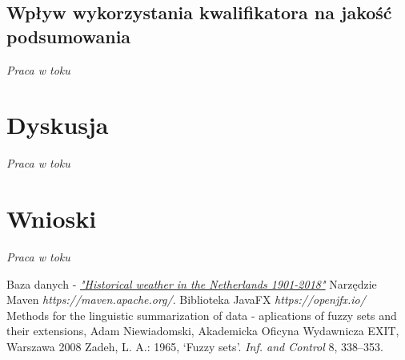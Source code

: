 \documentclass{classrep}
\begin{document}
\clearpage



\subsection{Wpływ wykorzystania kwalifikatora na jakość podsumowania}
\textit{Praca w toku}




\section{Dyskusja}
\textit{Praca w toku}


\section{Wnioski}
\textit{Praca w toku}


\begin{thebibliography}{5}
Baza danych - 
\href{https://www.kaggle.com/sinaasappel/historical-weather-in-the-netherlands-19012018}{\textit{"Historical weather in the Netherlands 1901-2018"}}
Narzędzie Maven\newline
\textit{https://maven.apache.org/}. 
Biblioteka JavaFX\newline
\textit{https://openjfx.io/}
Methods for the linguistic summarization of data - aplications of fuzzy sets and their extensions, Adam Niewiadomski, Akademicka Oficyna Wydawnicza EXIT, Warszawa 2008
Zadeh, L. A.: 1965, ‘Fuzzy sets’.  \textit{Inf. and Control} 8, 338–353.
\end{thebibliography}
\end{document}
